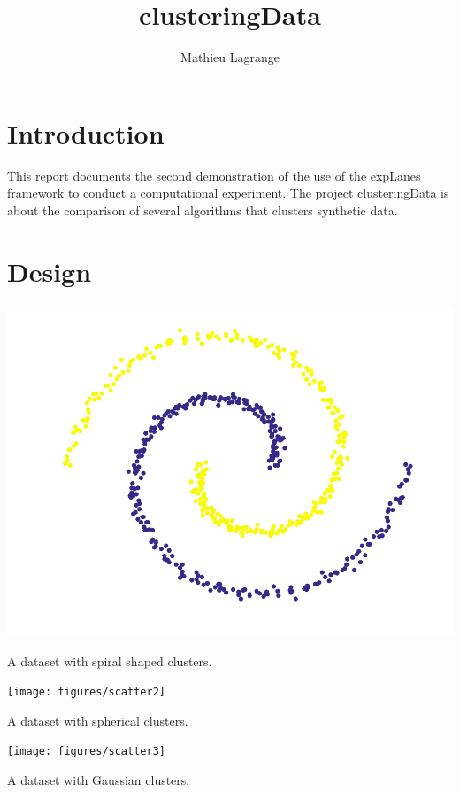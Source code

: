 \documentclass[12pt,a4paper,fleqn]{tufte-handout}
\title[clustering]{clusteringData}
\author{ Mathieu Lagrange }
\begin{document}
 
  
\maketitle 
  
\section{Introduction}


This report documents the second demonstration of the use of the expLanes framework to conduct a computational experiment. The project clusteringData is about the comparison of several algorithms that clusters synthetic data.

\section{Design}

\begin{marginfigure}
\includegraphics[width=\textwidth]{figures/scatter1}
\caption{A dataset with spiral shaped clusters.}
\label{scatter1}
\end{marginfigure}

\begin{marginfigure}
\texttt{[image: figures/scatter2]}
\caption{A dataset with spherical clusters.}
\label{scatter2}
\end{marginfigure}

\begin{marginfigure}
\texttt{[image: figures/scatter3]}
\caption{A dataset with Gaussian clusters.}
\label{scatter3}
\end{marginfigure}
\end{document}
